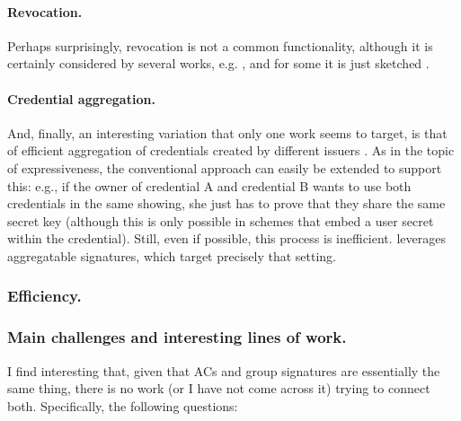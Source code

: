 \paragraph{Revocation.} %
Perhaps surprisingly, revocation is not a common functionality, although it is
certainly considered by several works, e.g. \cite{cl01,cks10,ckl+15}, and for
some it is just sketched \cite{hs21}.

\paragraph{Credential aggregation.} %
And, finally, an interesting variation that only one work seems to target,
is that of efficient aggregation of credentials created by different issuers
\cite{cl11}. As in the topic of expressiveness, the conventional approach
can easily be extended to support this: e.g., if the owner of credential A and
credential B wants to use both credentials in the same showing, she just has to
prove that they share the same secret key (although this is only possible in
schemes that embed a user secret within the credential). Still, even if
possible, this process is inefficient. \cite{cl11} leverages aggregatable
signatures, which target precisely that setting.

\subsubsection{Efficiency.}
%

\subsubsection{Main challenges and interesting lines of work.}
%

I find interesting that, given that ACs and group signatures are
essentially the same thing, there is no work (or I have not come across it)
trying to connect both. Specifically, the following questions:

